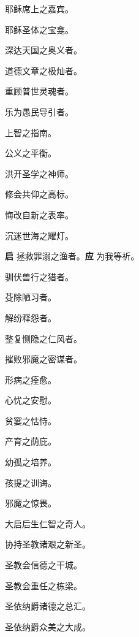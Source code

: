 \documentclass[UTF8,17pt]{ctexart}
\begin{document}
 耶稣席上之嘉宾。

 耶稣圣体之宝龛。

 深达天国之奥义者。

 道德⽂章之极灿者。

 重顾普世灵魂者。

 乐为愚民导引者。

 上智之指南。

 公义之平衡。

 洪开圣学之神师。

 修会共仰之⾼标。

 悔改⾃新之表率。

 沉迷世海之耀灯。

\textbf{启} \quad 拯救罪溺之渔者。\hfill \textbf{应} \quad 为我等祈。

 驯伏兽⾏之猎者。

 芟除陋习者。

 解纷释怨者。

 整复恻隐之仁风者。

 摧败邪魔之密谋者。

 形病之痊愈。

 ⼼忧之安慰。

 贫窭之怙恃。

 产育之荫庇。

 幼孤之培养。

 孩提之训诲。

 邪魔之惊畏。

 ⼤启后⽣仁智之奇⼈。

 协持圣教诸艰之新圣。

 圣教会信德之⼲城。

 圣教会重任之栋梁。

 圣依纳爵诸德之总汇。

 圣依纳爵众美之⼤成。
\end{document}

